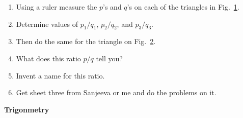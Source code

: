 \documentclass[12pt]{article}
\begin{document}
\begin{enumerate}
\setlength{\itemsep}{0mm}
  \item Using a ruler measure the $p$'s and $q$'s on each of the
    triangles in Fig.~\ref{triangle.1}.
  \item Determine values of $p_1/q_1$, $p_2/q_2$, and $p_3/q_3$.
  \item Then do the same for the triangle on Fig.~\ref{triangle.2}.
  \item What does this ratio $p/q$ tell you?
  \item Invent a name for this ratio.  
  \item Get sheet three from Sanjeeva or me and do the problems on it. 

\end{enumerate}

\begin{figure}[hbp]
\epsfxsize=5.8in
\begin{center}
\leavevmode
{}
\end{center}
\vspace{-2mm}
\caption{}
\label{triangle.1}
\end{figure}
\newpage
\begin{figure}[ht]
\epsfxsize=5.8in
\begin{center}
\leavevmode
{}
\end{center}
\vspace{-2mm}
\caption{}
\label{triangle.2}
\end{figure}




\newpage

\begin{center}
  {\bf Trigonmetry}\\
\end{center}

\hspace{2mm}\\
\end{document}
